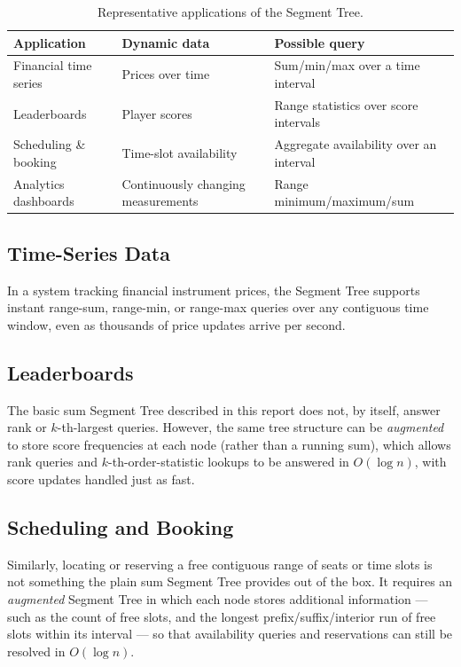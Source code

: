 \documentclass[11pt,open=any]{scrreprt}
\begin{document}
\begin{table}[h]
\centering
\caption{Representative applications of the Segment Tree.}
\label{tab:applications}
\begin{tabular}{p{3.1cm}p{4.3cm}p{5.3cm}}
\toprule
\textbf{Application} & \textbf{Dynamic data} & \textbf{Possible query} \\
\midrule
Financial time series & Prices over time & Sum/min/max over a time interval \\
Leaderboards & Player scores & Range statistics over score intervals \\
Scheduling \& booking & Time-slot availability & Aggregate availability over an interval \\
Analytics dashboards & Continuously changing measurements & Range minimum/maximum/sum \\
\bottomrule
\end{tabular}
\end{table}

\subsection{Time-Series Data}
In a system tracking financial instrument prices, the Segment Tree supports instant range-sum, range-min, or range-max queries over any contiguous time window, even as thousands of price updates arrive per second.

\subsection{Leaderboards}
The basic sum Segment Tree described in this report does not, by itself, answer rank or $k$-th-largest queries. However, the same tree structure can be \emph{augmented} to store score frequencies at each node (rather than a running sum), which allows rank queries and $k$-th-order-statistic lookups to be answered in $O(\log n)$, with score updates handled just as fast.

\subsection{Scheduling and Booking}
Similarly, locating or reserving a free contiguous range of seats or time slots is not something the plain sum Segment Tree provides out of the box. It requires an \emph{augmented} Segment Tree in which each node stores additional information --- such as the count of free slots, and the longest prefix/suffix/interior run of free slots within its interval --- so that availability queries and reservations can still be resolved in $O(\log n)$.
\end{document}

